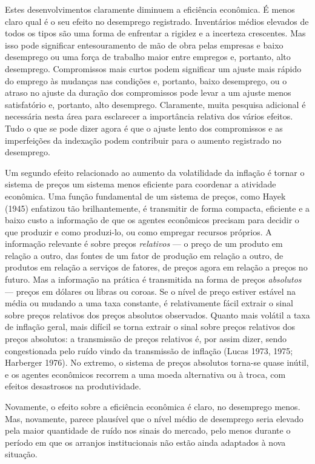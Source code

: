 \documentclass[12pt]{article}
\begin{document}
Estes desenvolvimentos claramente diminuem a eficiência econômica. É menos claro qual é o seu efeito no desemprego registrado. Inventários médios elevados de todos os tipos são uma forma de enfrentar a rigidez e a incerteza crescentes. Mas isso pode significar entesouramento de mão de obra pelas empresas e baixo desemprego ou uma força de trabalho maior entre empregos e, portanto, alto desemprego. Compromissos mais curtos podem significar um ajuste mais rápido do emprego às mudanças nas condições e, portanto, baixo desemprego, ou o atraso no ajuste da duração dos compromissos pode levar a um ajuste menos satisfatório e, portanto, alto desemprego. Claramente, muita pesquisa adicional é necessária nesta área para esclarecer a importância relativa dos vários efeitos. Tudo o que se pode dizer agora é que o ajuste lento dos compromissos e as imperfeições da indexação podem contribuir para o aumento registrado no desemprego.

Um segundo efeito relacionado ao aumento da volatilidade da inflação é tornar o sistema de preços um sistema menos eficiente para coordenar a atividade econômica. Uma função fundamental de um sistema de preços, como Hayek (1945) enfatizou tão brilhantemente, é transmitir de forma compacta, eficiente e a baixo custo a informação de que os agentes econômicos precisam para decidir o que produzir e como produzi-lo, ou como empregar recursos próprios. A informação relevante é sobre preços \textit{relativos} — o preço de um produto em relação a outro, das fontes de um fator de produção em relação a outro, de produtos em relação a serviços de fatores, de preços agora em relação a preços no futuro. Mas a informação na prática é transmitida na forma de preços \textit{absolutos} — preços em dólares ou libras ou coroas. Se o nível de preço estiver estável na média ou mudando a uma taxa constante, é relativamente fácil extrair o sinal sobre preços relativos dos preços absolutos observados. Quanto mais volátil a taxa de inflação geral, mais difícil se torna extrair o sinal sobre preços relativos dos preços absolutos: a transmissão de preços relativos é, por assim dizer, sendo congestionada pelo ruído vindo da transmissão de inflação (Lucas 1973, 1975; Harberger 1976). No extremo, o sistema de preços absolutos torna-se quase inútil, e os agentes econômicos recorrem a uma moeda alternativa ou à troca, com efeitos desastrosos na produtividade.

Novamente, o efeito sobre a eficiência econômica é claro, no desemprego menos. Mas, novamente, parece plausível que o nível médio de desemprego seria elevado pela maior quantidade de ruído nos sinais do mercado, pelo menos durante o período em que os arranjos institucionais não estão ainda adaptados à nova situação.
\end{document}
